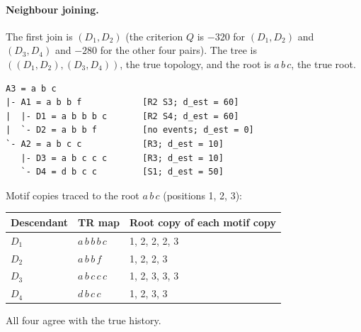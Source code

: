 \documentclass[11pt,a4paper]{article}
\begin{document}
\paragraph{Neighbour joining.} The first join is $(D_1,D_2)$ (the criterion $Q$ is $-320$ for
$(D_1,D_2)$ and $(D_3,D_4)$ and $-280$ for the other four pairs). The tree is
$((D_1,D_2),(D_3,D_4))$, the true topology, and the root is $a\,b\,c$, the true root.
\begin{lstlisting}
A3 = a b c
|- A1 = a b b f            [R2 S3; d_est = 60]
|  |- D1 = a b b b c       [R2 S4; d_est = 60]
|  `- D2 = a b b f         [no events; d_est = 0]
`- A2 = a b c c            [R3; d_est = 10]
   |- D3 = a b c c c       [R3; d_est = 10]
   `- D4 = d b c c         [S1; d_est = 50]
\end{lstlisting}
Motif copies traced to the root $a\,b\,c$ (positions 1, 2, 3):
\begin{center}
\begin{tabular}{lll}
\hline\hline
Descendant & TR map & Root copy of each motif copy \\ \hline
$D_1$ & $a\,b\,b\,b\,c$ & 1, 2, 2, 2, 3 \\
$D_2$ & $a\,b\,b\,f$ & 1, 2, 2, 3 \\
$D_3$ & $a\,b\,c\,c\,c$ & 1, 2, 3, 3, 3 \\
$D_4$ & $d\,b\,c\,c$ & 1, 2, 3, 3 \\ \hline\hline
\end{tabular}
\end{center}
All four agree with the true history.
\end{document}
